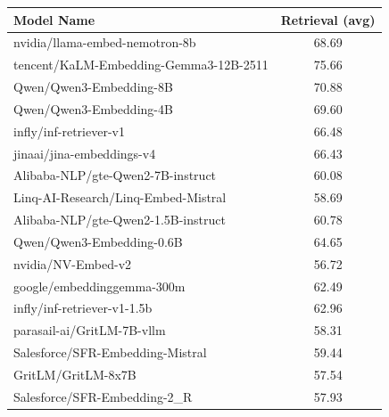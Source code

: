 \begin{xltabular}{\textwidth}{X c}
    \hline
    \textbf{Model Name}                                                  & \textbf{Retrieval (avg)} \\
    \hline
    nvidia/llama-embed-nemotron-8b                                       & 68.69                    \\
    tencent/KaLM-Embedding-Gemma3-12B-2511                               & 75.66                    \\
    Qwen/Qwen3-Embedding-8B                                              & 70.88                    \\
    Qwen/Qwen3-Embedding-4B                                              & 69.60                    \\
    infly/inf-retriever-v1                                               & 66.48                    \\
    jinaai/jina-embeddings-v4                                            & 66.43                    \\
    Alibaba-NLP/gte-Qwen2-7B-instruct                                    & 60.08                    \\
    Linq-AI-Research/Linq-Embed-Mistral                                  & 58.69                    \\
    Alibaba-NLP/gte-Qwen2-1.5B-instruct                                  & 60.78                    \\
    Qwen/Qwen3-Embedding-0.6B                                            & 64.65                    \\
    nvidia/NV-Embed-v2                                                   & 56.72                    \\
    google/embeddinggemma-300m                                           & 62.49                    \\
    infly/inf-retriever-v1-1.5b                                          & 62.96                    \\
    parasail-ai/GritLM-7B-vllm                                           & 58.31                    \\
    Salesforce/SFR-Embedding-Mistral                                     & 59.44                    \\
    GritLM/GritLM-8x7B                                                   & 57.54                    \\
    Salesforce/SFR-Embedding-2\_R                                        & 57.93                    \\

\end{xltabular}
